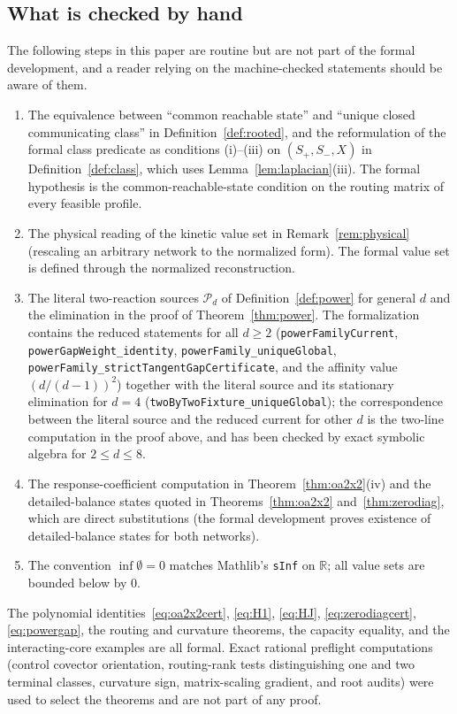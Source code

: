\documentclass[11pt,reqno]{amsart}
\theoremstyle{plain}
\theoremstyle{definition}
\theoremstyle{remark}
\numberwithin{equation}{section}
\newcommand{\R}{\mathbb{R}}
\newcommand{\Sp}{S_{+}}
\newcommand{\Sm}{S_{-}}
\begin{document}
\subsection{What is checked by hand}\label{subsec:notformal}
The following steps in this paper are routine but are not part of the formal development, and a reader relying on the machine-checked statements should be aware of them.
\begin{enumerate}[label=(\arabic*)]
\item The equivalence between ``common reachable state'' and ``unique closed communicating class'' in Definition~\ref{def:rooted}, and the reformulation of the formal class predicate as conditions (i)--(iii) on $(\Sp,\Sm,X)$ in Definition~\ref{def:class}, which uses Lemma~\ref{lem:laplacian}(iii).  The formal hypothesis is the common-reachable-state condition on the routing matrix of every feasible profile.
\item The physical reading of the kinetic value set in Remark~\ref{rem:physical} (rescaling an arbitrary network to the normalized form).  The formal value set is defined through the normalized reconstruction.
\item The literal two-reaction sources $\mathcal P_d$ of Definition~\ref{def:power} for general $d$ and the elimination in the proof of Theorem~\ref{thm:power}.  The formalization contains the reduced statements for all $d\ge2$ (\texttt{powerFamilyCurrent}, \texttt{powerGapWeight\_\allowbreak identity}, \texttt{powerFamily\_\allowbreak uniqueGlobal}, \texttt{powerFamily\_\allowbreak strictTangentGapCertificate}, and the affinity value $(d/(d-1))^2$) together with the literal source and its stationary elimination for $d=4$ (\texttt{twoByTwoFixture\_\allowbreak uniqueGlobal}); the correspondence between the literal source and the reduced current for other $d$ is the two-line computation in the proof above, and has been checked by exact symbolic algebra for $2\le d\le8$.
\item The response-coefficient computation in Theorem~\ref{thm:oa2x2}(iv) and the detailed-balance states quoted in Theorems~\ref{thm:oa2x2} and~\ref{thm:zerodiag}, which are direct substitutions (the formal development proves existence of detailed-balance states for both networks).
\item The convention $\inf\emptyset=0$ matches Mathlib's \texttt{sInf} on $\R$; all value sets are bounded below by $0$.
\end{enumerate}
The polynomial identities~\eqref{eq:oa2x2cert}, \eqref{eq:H1}, \eqref{eq:HJ}, \eqref{eq:zerodiagcert}, \eqref{eq:powergap}, the routing and curvature theorems, the capacity equality, and the interacting-core examples are all formal.  Exact rational preflight computations (control covector orientation, routing-rank tests distinguishing one and two terminal classes, curvature sign, matrix-scaling gradient, and root audits) were used to select the theorems and are not part of any proof.
\end{document}

